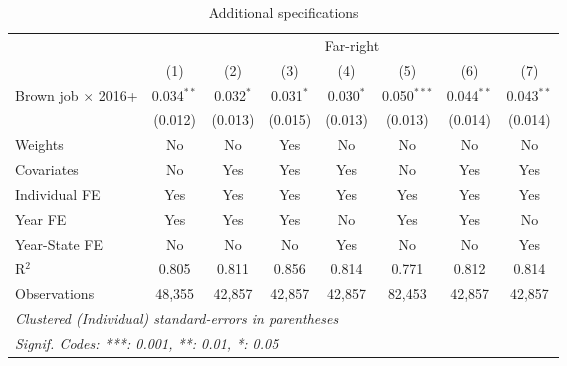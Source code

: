 \begin{table}[htbp]
   \caption{Additional specifications}
   \centering
   \begin{tabular}{lccccccc}
      \tabularnewline \midrule \midrule
       & \multicolumn{7}{c}{Far-right}\\
                                & (1)          & (2)         & (3)         & (4)         & (5)           & (6)          & (7)\\  
      Brown job $\times$ 2016+  & 0.034$^{**}$ & 0.032$^{*}$ & 0.031$^{*}$ & 0.030$^{*}$ & 0.050$^{***}$ & 0.044$^{**}$ & 0.043$^{**}$\\   
                                & (0.012)      & (0.013)     & (0.015)     & (0.013)     & (0.013)       & (0.014)      & (0.014)\\   
      Weights                   & No           & No          & Yes         & No          & No            & No           & No\\  
      Covariates                & No           & Yes         & Yes         & Yes         & No            & Yes          & Yes\\  
      Individual FE             & Yes          & Yes         & Yes         & Yes         & Yes           & Yes          & Yes\\  
      Year FE                   & Yes          & Yes         & Yes         & No          & Yes           & Yes          & No\\  
      Year-State FE             & No           & No          & No          & Yes         & No            & No           & Yes\\  
      R$^2$                     & 0.805        & 0.811       & 0.856       & 0.814       & 0.771         & 0.812        & 0.814\\  
      Observations              & 48,355       & 42,857      & 42,857      & 42,857      & 82,453        & 42,857       & 42,857\\  
      \midrule \midrule
      \multicolumn{8}{l}{\emph{Clustered (Individual) standard-errors in parentheses}}\\
      \multicolumn{8}{l}{\emph{Signif. Codes: ***: 0.001, **: 0.01, *: 0.05}}\\
   \end{tabular}
\end{table}



